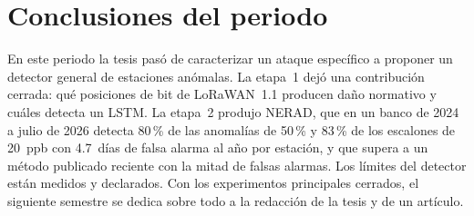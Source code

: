 \documentclass[11pt, letterpaper]{article}
\begin{document}
\section{Conclusiones del periodo}

En este periodo la tesis pasó de caracterizar un ataque específico a proponer un detector
general de estaciones anómalas. La etapa~1 dejó una contribución cerrada: qué posiciones
de bit de LoRaWAN~1.1 producen daño normativo y cuáles detecta un LSTM. La etapa~2 produjo
NERAD, que en un banco de 2024 a julio de 2026 detecta 80\,\% de las anomalías de 50\,\% y
83\,\% de los escalones de 20~ppb con 4.7~días de falsa alarma al año por estación, y que
supera a un método publicado reciente con la mitad de falsas alarmas. Los límites del
detector están medidos y declarados. Con los experimentos principales cerrados, el
siguiente semestre se dedica sobre todo a la redacción de la tesis y de un artículo.

\printbibliography[heading=bibintoc, title={Referencias}]
\end{document}
